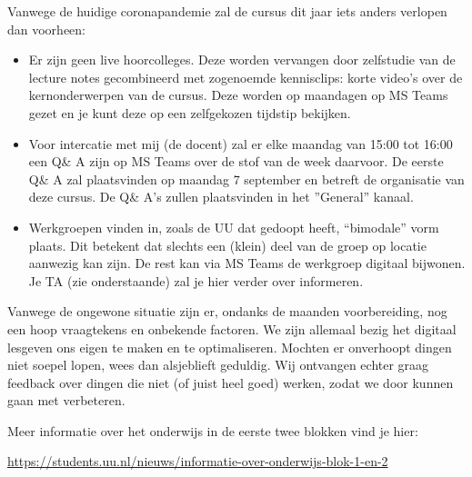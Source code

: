 Vanwege de huidige coronapandemie zal de cursus dit jaar iets anders verlopen dan voorheen:

\begin{itemize}
  \item
    Er zijn geen live hoorcolleges.
    Deze worden vervangen door zelfstudie van de lecture notes gecombineerd met zogenoemde kennisclips: korte video's over de kernonderwerpen van de cursus.
    Deze worden op maandagen op MS Teams gezet en je kunt deze op een zelfgekozen tijdstip bekijken.

  \item Voor intercatie met mij (de docent) zal er elke maandag van 15:00 tot 16:00 een Q\& A zijn op MS Teams over de stof van de week daarvoor. De eerste Q\& A zal plaatsvinden op maandag 7 september en betreft de organisatie van deze cursus.
  De Q\& A's zullen plaatsvinden in het ''General'' kanaal. %
  \item %
  Werkgroepen vinden in, zoals de UU dat gedoopt heeft, ``bimodale'' vorm plaats. Dit betekent dat slechts een (klein) deel van de groep op locatie aanwezig kan zijn. De rest kan via MS Teams de werkgroep digitaal bijwonen. Je TA (zie onderstaande) zal je hier verder over informeren.
\end{itemize}

Vanwege de ongewone situatie zijn er, ondanks de maanden voorbereiding, nog een hoop vraagtekens en onbekende factoren. We zijn allemaal bezig het digitaal lesgeven ons eigen te maken en te optimaliseren. Mochten er onverhoopt dingen niet soepel lopen, wees dan alsjeblieft geduldig. Wij ontvangen echter graag feedback over dingen die niet (of juist heel goed) werken, zodat we door kunnen gaan met verbeteren.

Meer informatie over het onderwijs in de eerste twee blokken vind je hier:
\begin{center}
\url{https://students.uu.nl/nieuws/informatie-over-onderwijs-blok-1-en-2}
\end{center}

